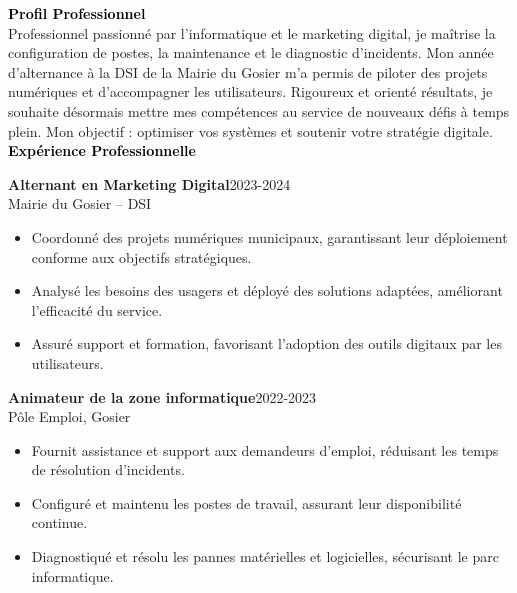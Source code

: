 \documentclass{article}
\begin{document}
\begin{paracol}{2}
\switchcolumn
\color{black}

\textcolor{black}{\Large \textbf{Profil Professionnel}} \\[2pt]
Professionnel passionné par l’informatique et le marketing digital, je maîtrise la configuration de postes, la maintenance et le diagnostic d’incidents. Mon année d’alternance à la DSI de la Mairie du Gosier m’a permis de piloter des projets numériques et d’accompagner les utilisateurs. Rigoureux et orienté résultats, je souhaite désormais mettre mes compétences au service de nouveaux défis à temps plein. Mon objectif : optimiser vos systèmes et soutenir votre stratégie digitale. \\[8pt]

\textcolor{black}{\Large \textbf{Expérience Professionnelle}} \\[2pt]
\colorbox{maincolor}{%
  \begin{minipage}{\linewidth}
    \noindent
    \textbf{Alternant en Marketing Digital}\hfill 2023-2024\\
    Mairie du Gosier – DSI\\[-0.3em]
    \begin{itemize}[leftmargin=*]
      \item Coordonné des projets numériques municipaux, garantissant leur déploiement conforme aux objectifs stratégiques. \item Analysé les besoins des usagers et déployé des solutions adaptées, améliorant l’efficacité du service. \item Assuré support et formation, favorisant l’adoption des outils digitaux par les utilisateurs.
    \end{itemize}
  \end{minipage}}

\vspace{3mm}

\colorbox{maincolor}{%
  \begin{minipage}{\linewidth}
    \noindent
    \textbf{Animateur de la zone informatique}\hfill 2022-2023\\
    Pôle Emploi, Gosier\\[-0.3em]
    \begin{itemize}[leftmargin=*]
      \item Fournit assistance et support aux demandeurs d’emploi, réduisant les temps de résolution d’incidents. \item Configuré et maintenu les postes de travail, assurant leur disponibilité continue. \item Diagnostiqué et résolu les pannes matérielles et logicielles, sécurisant le parc informatique.
    \end{itemize}
  \end{minipage}}


\end{paracol}
\end{document}
